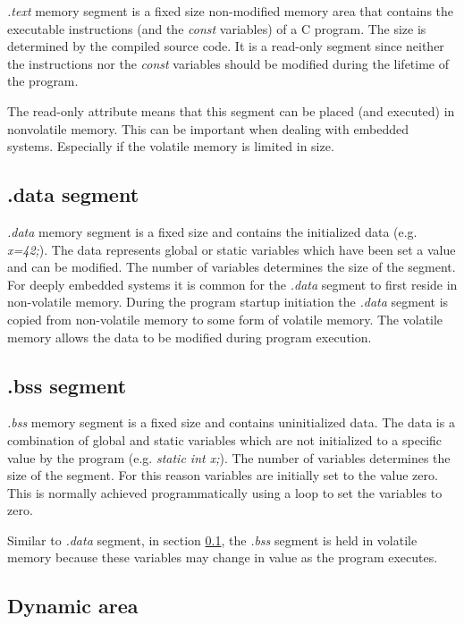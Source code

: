 \textit{.text} memory segment is a fixed size non-modified memory area that contains the executable instructions (and the \textit{const} variables) of a C program. The size is determined by the compiled source code. It is a read-only segment since neither the instructions nor the \textit{const} variables should be modified during the lifetime of the program. 

The read-only attribute means that this segment can be placed (and executed) in nonvolatile memory. This can be important when dealing with embedded systems. Especially if the volatile memory is limited in size.

\subsection{.data segment} \label{.data} 

\textit{.data} memory segment is a fixed size and contains the initialized data (e.g. \textit{x=42;}). The data represents global or static variables which have been set a value and can be modified. The number of variables determines the size of the segment. For deeply embedded systems it is common for the \textit{.data} segment to first reside in non-volatile memory. During the program startup initiation the \textit{.data} segment is copied from non-volatile memory to some form of volatile memory. The volatile memory allows the data to be modified during program execution.

\subsection{.bss segment} 

\textit{.bss} memory segment is a fixed size and contains uninitialized data. The data is a combination of global and static variables which are not initialized to a specific value by the program (e.g. \textit{static int x;}). The number of variables determines the size of the segment. For this reason variables are initially set to the value zero. This is normally achieved programmatically using a loop to set the variables to zero.

Similar to \textit{.data} segment, in section \ref{.data}, the \textit{.bss} segment is held in volatile memory because these variables may change in value as the program executes.

\subsection{Dynamic area}

